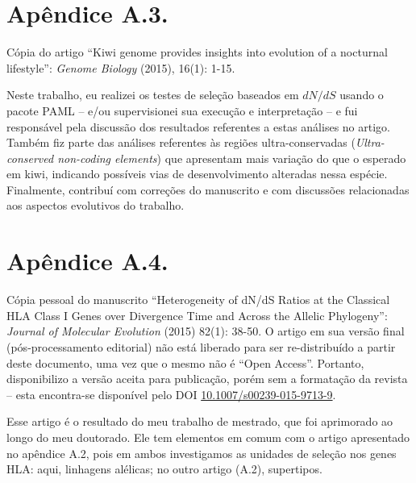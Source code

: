 \section{Apêndice A.3.}

Cópia do artigo \enquote{Kiwi genome provides insights into evolution of a nocturnal lifestyle}: \emph{Genome Biology} (2015), 16(1): 1-15.

Neste trabalho, eu realizei os testes de seleção baseados em $dN/dS$ usando o pacote PAML -- e/ou supervisionei sua execução e interpretação --  e fui responsável pela discussão dos resultados referentes a estas análises no artigo. Também fiz parte das análises referentes às regiões ultra-conservadas (\emph{Ultra-conserved non-coding elements}) que apresentam mais variação do que o esperado em kiwi, indicando possíveis vias de desenvolvimento alteradas nessa espécie. Finalmente, contribuí com correções do manuscrito e com discussões relacionadas aos aspectos evolutivos do trabalho.




 
\section{Apêndice A.4.}


Cópia pessoal do manuscrito \enquote{Heterogeneity of dN/dS Ratios at the Classical HLA Class I Genes over Divergence Time and Across the Allelic Phylogeny}: \emph{Journal of Molecular Evolution} (2015) 82(1): 38-50. O artigo em sua versão final (pós-processamento editorial) não está liberado para ser re-distribuído a partir deste documento, uma vez que o mesmo não é \enquote{Open Access}. Portanto, disponibilizo a versão aceita para publicação, porém sem a formatação da revista -- esta encontra-se disponível pelo DOI \href{http://link.springer.com/article/10.1007/s00239-015-9713-9}{10.1007/s00239-015-9713-9}.
 
Esse artigo é o resultado do meu trabalho de mestrado, que foi aprimorado ao longo do meu doutorado. Ele tem elementos em comum com o artigo apresentado no apêndice A.2, pois em ambos investigamos as unidades de seleção nos genes HLA: aqui, linhagens alélicas; no outro artigo (A.2), supertipos. 


